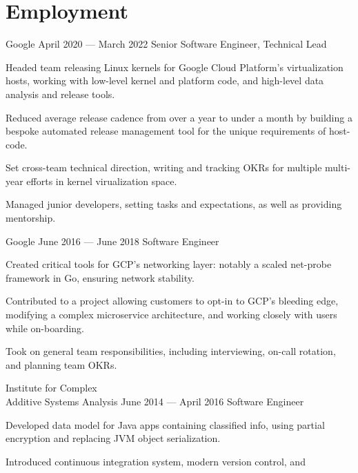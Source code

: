 \documentclass{tc_cv}
\newcommand{\jobSpace}{\vspace{0.75em}}
\begin{document}
\begin{minipage}[t]{0.6\linewidth}
  \section{Employment}
  \begin{job}{Google}
    {April 2020 --- March 2022}
    {Senior Software Engineer, Technical Lead}
    \item Headed team releasing Linux kernels for Google Cloud Platform's
      virtualization hosts, working with low-level kernel and platform code,
      and high-level data analysis and release tools.
    \item Reduced average release cadence from over a year to under a month
      by building a bespoke automated release management tool for the unique
      requirements of host-code.
    \item Set cross-team technical direction, writing and tracking OKRs for
      multiple multi-year efforts in kernel virualization space.
    \item Managed junior developers, setting tasks and expectations, as well as
      providing mentorship.
  \end{job}
  \jobSpace
  \begin{job}{Google}
    {June 2016 --- June 2018}
    {Software Engineer}
  \item Created critical tools for GCP's networking layer: notably a scaled
    net-probe framework in Go, ensuring network stability.
  \item Contributed to a project allowing customers to opt-in to GCP's bleeding
    edge, modifying a complex microservice architecture, and working closely
    with users while on-boarding.
  \item Took on general team responsibilities, including interviewing, on-call
    rotation, and planning team OKRs.
  \end{job}
  \jobSpace
  \begin{job}{Institute for Complex \\ Additive Systems Analysis}
    {June 2014 --- April 2016}
    {Software Engineer}
    \item Developed data model for Java apps containing classified info,
      using partial encryption and replacing JVM object serialization.
    \item Introduced continuous integration system, modern version control, and

\end{job}
\end{minipage}
\end{document}
